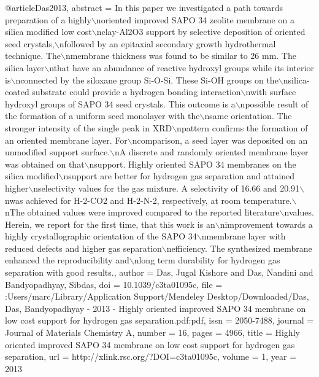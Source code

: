 @article{Das2013,
abstract = {In this paper we investigated a path towards preparation of a highly$\backslash$noriented improved SAPO 34 zeolite membrane on a silica modified low cost$\backslash$nclay-Al2O3 support by selective deposition of oriented seed crystals,$\backslash$nfollowed by an epitaxial secondary growth hydrothermal technique. The$\backslash$nmembrane thickness was found to be similar to 26 mm. The silica layer$\backslash$nthat have an abundance of reactive hydroxyl groups while its interior is$\backslash$nconnected by the siloxane group Si-O-Si. These Si-OH groups on the$\backslash$nsilica-coated substrate could provide a hydrogen bonding interaction$\backslash$nwith surface hydroxyl groups of SAPO 34 seed crystals. This outcome is a$\backslash$npossible result of the formation of a uniform seed monolayer with the$\backslash$nsame orientation. The stronger intensity of the single peak in XRD$\backslash$npattern confirms the formation of an oriented membrane layer. For$\backslash$ncomparison, a seed layer was deposited on an unmodified support surface.$\backslash$nA discrete and randomly oriented membrane layer was obtained on that$\backslash$nsupport. Highly oriented SAPO 34 membranes on the silica modified$\backslash$nsupport are better for hydrogen gas separation and attained higher$\backslash$nselectivity values for the gas mixture. A selectivity of 16.66 and 20.91$\backslash$nwas achieved for H-2-CO2 and H-2-N-2, respectively, at room temperature.$\backslash$nThe obtained values were improved compared to the reported literature$\backslash$nvalues. Herein, we report for the first time, that this work is an$\backslash$nimprovement towards a highly crystallographic orientation of the SAPO 34$\backslash$nmembrane layer with reduced defects and higher gas separation$\backslash$nefficiency. The synthesized membrane enhanced the reproducibility and$\backslash$nlong term durability for hydrogen gas separation with good results.},
author = {Das, Jugal Kishore and Das, Nandini and Bandyopadhyay, Sibdas},
doi = {10.1039/c3ta01095c},
file = {:Users/marc/Library/Application Support/Mendeley Desktop/Downloaded/Das, Das, Bandyopadhyay - 2013 - Highly oriented improved SAPO 34 membrane on low cost support for hydrogen gas separation.pdf:pdf},
issn = {2050-7488},
journal = {Journal of Materials Chemistry A},
number = {16},
pages = {4966},
title = {{Highly oriented improved SAPO 34 membrane on low cost support for hydrogen gas separation}},
url = {http://xlink.rsc.org/?DOI=c3ta01095c},
volume = {1},
year = {2013}
}
